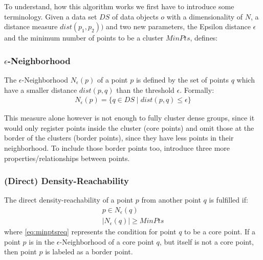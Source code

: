 To understand, how this algorithm works we first have to introduce some terminology.
Given a data set $DS$ of data objects $o$ with a dimensionality of $N$, a distance measure $dist(p_1,p_2))$ and two new parameters, the Epsilon distance $\epsilon$ and the minimum number of points to be a cluster $MinPts$,  \citeauthor{DBSCANEKSX96} defines:

\subsubsection*{$\epsilon$-Neighborhood}
The $\epsilon$-Neighborhood $N_{\epsilon}(p)$ of a point $p$ is defined by the set of points $q$ which have a smaller distance $dist(p,q)$ than the threshold $\epsilon$. Formally: 
\begin{align}
    N_{\epsilon}(p)=\{q \in DS \mid dist(p,q) \leq \epsilon\}
\end{align}

This measure alone however is not enough to fully cluster dense groups, since it would only register points inside the cluster (core points) and omit those at the border of the clusters (border points), since they have less points in their neighborhood. To include those border points too,  \citeauthor{DBSCANEKSX96} introduce three more properties/relationships between points.

\subsubsection*{(Direct) Density-Reachability}
The direct density-reachability of a point $p$ from another point $q$ is fulfilled if:
\begin{align}
    p \in N_{\epsilon}(q)\label{eq:pinN}\\
    |N_{\epsilon}(q)|\geq MinPts\label{eq:minptsreq}
\end{align}
where \autoref{eq:minptsreq} represents the condition for point \(q\) to be a core point. If a point \(p\) is in the $\epsilon$-Neighborhood of a core point $q$, but itself is not a core point, then point $p$ is labeled as a border point. 

